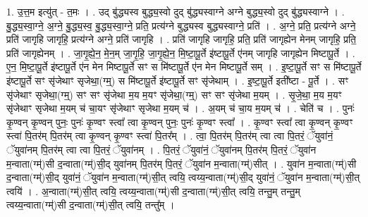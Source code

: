 \documentclass[17pt]{extarticle}
\begin{document}
1. उ॒त्त॒म इत्यु॑त् - त॒मः । . उद् बु॑द्ध्यस्व बुद्ध्य॒स्वो दुद् बु॑द्ध्यस्वाग्ने अग्ने बुद्ध्य॒स्वो दुद् बु॑द्ध्यस्वाग्ने । . बु॒द्ध्य॒स्वा॒ग्ने॒ अ॒ग्ने॒ बु॒द्ध्य॒स्व॒ बु॒द्ध्य॒स्वा॒ग्ने॒ प्रति॒ प्रत्य॑ग्ने बुद्ध्यस्व बुद्ध्यस्वाग्ने॒ प्रति॑ । . अ॒ग्ने॒ प्रति॒ प्रत्य॑ग्ने अग्ने॒ प्रति॑ जागृहि जागृहि॒ प्रत्य॑ग्ने अग्ने॒ प्रति॑ जागृहि । . प्रति॑ जागृहि जागृहि॒ प्रति॒ प्रति॑ जागृह्येन मेनम् जागृहि॒ प्रति॒ प्रति॑ जागृह्येनम् । . जा॒गृ॒ह्ये॒न॒ मे॒न॒म् जा॒गृ॒हि॒ जा॒गृ॒ह्ये॒न॒ मि॒ष्टा॒पू॒र्ते इ॑ष्टापू॒र्ते ए॑नम् जागृहि जागृह्येन मिष्टापू॒र्ते । . ए॒न॒ मि॒ष्टा॒पू॒र्ते इ॑ष्टापू॒र्ते ए॑न मेन मिष्टापू॒र्ते सꣳ स मि॑ष्टापू॒र्ते ए॑न मेन मिष्टापू॒र्ते सम् । . इ॒ष्टा॒पू॒र्ते सꣳ स मि॑ष्टापू॒र्ते इ॑ष्टापू॒र्ते सꣳ सृ॑जेथाꣳ सृजेथा॒(ग्म्॒) स मि॑ष्टापू॒र्ते इ॑ष्टापू॒र्ते सꣳ सृ॑जेथाम् । . इ॒ष्टा॒पू॒र्ते इती᳚ष्टा - पू॒र्ते । . सꣳ सृ॑जेथाꣳ सृजेथा॒(ग्म्॒) सꣳ सꣳ सृ॑जेथा म॒य म॒यꣳ सृ॑जेथा॒(ग्म्॒) सꣳ सꣳ सृ॑जेथा म॒यम् । . सृ॒जे॒था॒ म॒य म॒यꣳ सृ॑जेथाꣳ सृजेथा म॒यम् च॑ चा॒यꣳ सृ॑जेथाꣳ सृजेथा म॒यम् च॑ । . अ॒यम् च॑ चा॒य म॒यम् च॑ । . चेति॑ च । . पुनः॑ कृ॒ण्वन् कृ॒ण्वन् पुनः॒ पुनः॑ कृ॒ण्वꣳ स्त्वा᳚ त्वा कृ॒ण्वन् पुनः॒ पुनः॑ कृ॒ण्वꣳ स्त्वा᳚ । . कृ॒ण्वꣳ स्त्वा᳚ त्वा कृ॒ण्वन् कृ॒ण्वꣳ स्त्वा॑ पि॒तर॑म् पि॒तर॑म् त्वा कृ॒ण्वन् कृ॒ण्वꣳ स्त्वा॑ पि॒तर᳚म् । . त्वा॒ पि॒तर॑म् पि॒तर॑म् त्वा त्वा पि॒तरं॒ ॅयुवा॑नं॒ ॅयुवा॑नम् पि॒तर॑म् त्वा त्वा पि॒तरं॒ ॅयुवा॑नम् । . पि॒तरं॒ ॅयुवा॑नं॒ ॅयुवा॑नम् पि॒तर॑म् पि॒तरं॒ ॅयुवा॑न म॒न्वाता(ग्म्॑)सी द॒न्वाता(ग्म्॑)सी॒द् युवा॑नम् पि॒तर॑म् पि॒तरं॒ ॅयुवा॑न म॒न्वाता(ग्म्॑)सीत् । . युवा॑न म॒न्वाता(ग्म्॑)सी द॒न्वाता(ग्म्॑)सी॒द् युवा॑नं॒ ॅयुवा॑न म॒न्वाता(ग्म्॑)सी॒त् त्वयि॒ त्वय्य॒न्वाता(ग्म्॑)सी॒द् युवा॑नं॒ ॅयुवा॑न म॒न्वाता(ग्म्॑)सी॒त् त्वयि॑ । . अ॒न्वाता(ग्म्॑)सी॒त् त्वयि॒ त्वय्य॒न्वाता(ग्म्॑)सी द॒न्वाता(ग्म्॑)सी॒त् त्वयि॒ तन्तु॒म् तन्तु॒म् त्वय्य॒न्वाता(ग्म्॑)सी द॒न्वाता(ग्म्॑)सी॒त् त्वयि॒ तन्तु᳚म् । \newline
\end{document}
